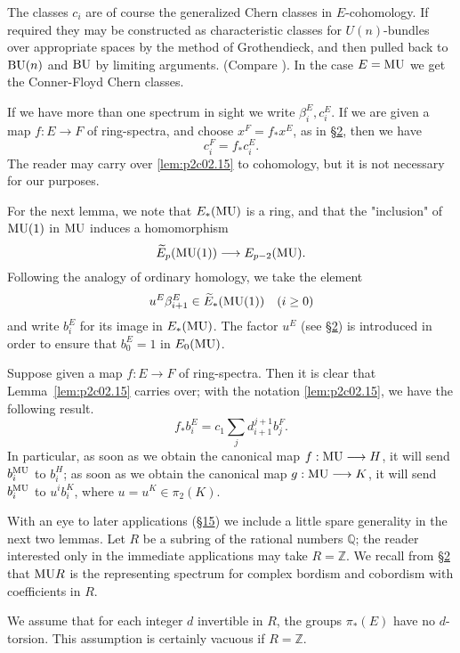 \documentclass[../main]{subfiles}
\begin{document}
The classes $c_i$ are of course the generalized Chern classes in $E$-cohomology. If required they may be constructed as characteristic classes for $U(n)$-bundles over appropriate spaces by the method of Grothendieck, and then pulled back to $\mathrm{BU}(n)$ and $\mathrm{BU}$ by limiting arguments. (Compare \cite[pp.~8-9]{adams2}). In the case $E=\mathrm{MU}$ we get the Conner-Floyd Chern classes.

If we have more than one spectrum in sight we write $\beta_i^E,c_i^E$. If we are given a map $f:E\longrightarrow F$ of ring-spectra, and choose $x^F=f_\ast x^E$, as in \hyperref[sec:p2c2]{\S 2}, then we have 
\[c_i^F=f_\ast c_i^E.\]
The reader may carry over \eqref{lem:p2c02.15} to cohomology, but it is not necessary for our purposes.

For the next lemma, we note that $E_\ast(\mathrm{MU})$ is a ring, and that the "inclusion" of $\mathrm{MU}(1)$ in $\mathrm{MU}$ induces a homomorphism
\[\widetilde{E}_p(\mathrm{MU}(1))\longrightarrow E_{p-2}(\mathrm{MU}).\]
Following the analogy of ordinary homology, we take the element
\[u^E\beta_{i+1}^E\in \widetilde{E}_\ast(\mathrm{MU}(1)) \quad (i\geq 0)\]
and write $b_i^E$ for its image in $E_\ast(\mathrm{MU})$. The factor $u^E$ (see \hyperref[sec:p2c2]{\S 2}) is introduced in order to ensure that $b_0^E=1$ in $E_0(\mathrm{MU})$.

Suppose given a map $f:E\longrightarrow F$ of ring-spectra. Then it is clear that Lemma~\ref{lem:p2c02.15} carries over; with the notation \eqref{lem:p2c02.15}, we have the following result.
\begin{equation}
\label{eqn:p2c04.4}
\tag{4.4}
    f_\ast b_i^E=c_1\sum_jd_{i+1}^{j+1}b_j^F.
\end{equation}
In particular, as soon as we obtain the canonical map $f:\mathrm{MU}\longrightarrow H$, it will send $b_i^{\mathrm{MU}}$ to $b_i^H$; as soon as we obtain the canonical map $g:\mathrm{MU}\longrightarrow K$, it will send $b_i^{\mathrm{MU}}$ to $u^ib_i^K$, where $u=u^K\in \pi_2(K)$.

With an eye to later applications (\hyperref[sec:p2c15]{\S 15}) we include a little spare generality in the next two lemmas. Let $R$ be a subring of the rational numbers $\mathbb{Q}$; the reader interested only in the immediate applications may take $R=\mathbb{Z}$. We recall from \hyperref[sec:p2c2]{\S 2} that $\mathrm{MU}R$ is the representing spectrum for complex bordism and cobordism with coefficients in $R$.

We assume that for each integer $d$ invertible in $R$, the groups $\pi_\ast(E)$ have no $d$-torsion. This assumption is certainly vacuous if $R=\mathbb{Z}$.
\end{document}
